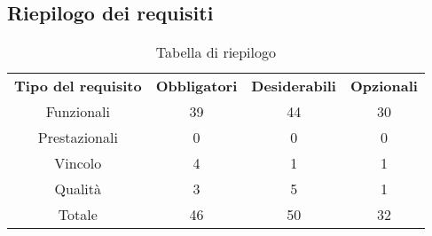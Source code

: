 \subsection{Riepilogo dei requisiti}
\begin{table}[h]
\centering
\begin{tabular}{| c | c | c | c |}
		\rowcolor{LightBlue}
		\color{white}\bfseries Tipo del requisito & \color{white}\bfseries Obbligatori & \color{white}\bfseries Desiderabili & \color{white}\bfseries Opzionali \\[0.25cm]
		 Funzionali & 39 & 44 & 30 \\
		 Prestazionali & 0 & 0 & 0 \\
		 Vincolo & 4 & 1 & 1 \\
		 Qualità & 3 & 5 & 1 \\
		 Totale & 46 & 50 & 32 \\ \hline
\end{tabular}
		\caption{Tabella di riepilogo}
\end{table}


\newpage